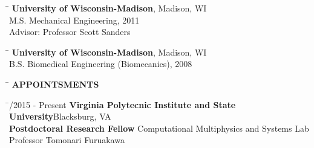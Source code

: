 \documentclass[11pt,letter]{article}
\begin{document}
\begin{tabbing}
	\hspace{3cm} \= \kill
	{\footnotesize } \> {\bf University of Wisconsin-Madison}, Madison, WI\\
	\> \quad M.S.  Mechanical Engineering, 2011 \\
	\> \quad Advisor: Professor Scott Sanders
\end{tabbing}
\begin{tabbing}
	\hspace{3cm} \= \kill
	{\footnotesize } \> {\bf University of Wisconsin-Madison}, Madison, WI\\
	\> \quad B.S.  Biomedical Engineering (Biomecanics), 2008\\
\end{tabbing}


\begin{tabbing}
	\hspace{1cm}\=\kill
	\>  {\bf \Large APPOINTSMENTS}
\end{tabbing}\vspace{-7mm}
\begin{tabbing}
	\hspace{3cm} \= /2015 - Present \> {\bf Virginia Polytecnic Institute and State University}\hfill{Blacksburg, VA }\\
	\> {\bfseries Postdoctoral Research Fellow}	Computational Multiphysics and Systems Lab\\
	\> Professor Tomonari Furuakawa\\
\end{tabbing}
\vspace{-1cm}
\end{document}
